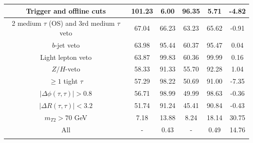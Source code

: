 \documentclass{ws-mpla}
\begin{document}
\begin{table}[h!]
{\begin{tabular}{@{}c c c c c c@{}}
Trigger and offline cuts                        &   101.23 &  6.00 &    96.35 &  5.71 &  -4.82 \\ \hline
2 medium $\tau$ (OS) and 3rd medium $\tau$ veto &    67.04 & 66.23 &    63.23 & 65.62 &  -0.91 \\ \hline
$b$-jet veto                                    &    63.98 & 95.44 &    60.37 & 95.47 &   0.04 \\ \hline
Light lepton veto                               &    63.87 & 99.83 &    60.36 & 99.99 &   0.16 \\ \hline
$Z/H$-veto                                      &    58.33 & 91.33 &    55.70 & 92.28 &   1.04 \\ \hline
$ \geq 1 $ tight $\tau$                         &    57.29 & 98.22 &    50.69 & 91.00 &  -7.35 \\ \hline
$ |\Delta\phi(\tau,\tau)| > 0.8 $               &    56.71 & 98.99 &    49.99 & 98.63 &  -0.36 \\ \hline
$ |\Delta R(\tau,\tau)| < 3.2 $                 &    51.74 & 91.24 &    45.41 & 90.84 &  -0.43 \\ \hline
$ m_{T2} > 70 $ GeV                             &     7.18 & 13.88 &     8.24 & 18.14 &  30.75 \\ \hline
All                                             &        - &  0.43 &        - &  0.49 &  14.76 \\ \botrule
\end{tabular}
\label{tab:120GeV} }
\end{table}
\end{document}
